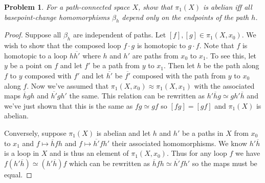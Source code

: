 \documentclass{article}
\newtheorem{problem}{Problem}
\begin{document}
\begin{problem}
For a path-connected space $X$, show that $\pi_1(X)$ is abelian iff all basepoint-change homomorphisms $\beta_h$ depend only on the endpoints of the path $h$.
\end{problem}
\begin{proof}
Suppose all $\beta_h$ are independent of paths. Let $[f],[g] \in \pi_1(X, x_0)$. We wish to show that the composed loop $f \cdot g$ is homotopic to $g \cdot f$. Note that $f$ is homotopic to a loop $h\overline{h'}$ where $h$ and $h'$ are paths from $x_0$ to $x_1$. To see this, let $y$ be a point on $f$ and let $f'$ be a path from $y$ to $x_1$. Then let $h$ be the path along $f$ to $y$ composed with $f'$ and let $\overline{h'}$ be $\overline{f'}$ composed with the path from $y$ to $x_0$ along $f$.
\vspace{100pt}
Now we've assumed that $\pi_1(X,x_0) \approx \pi_1(X,x_1)$ with the associated maps $\overline{h}gh$ and $\overline{h'}gh'$ the same. This relation can be rewritten as $h'\overline{h}g \simeq gh'\overline{h}$ and we've just shown that this is the same as $fg \simeq gf$ so $[fg] = [gf]$ and $\pi_1(X)$ is abelian.

Conversely, suppose $\pi_1(X)$ is abelian and let $h$ and $h'$ be a paths in $X$ from $x_0$ to $x_1$ and $f \mapsto \overline{h}fh$ and $f \mapsto \overline{h'}fh'$ their associated homomorphisms. We know $h' \overline{h}$ is a loop in $X$ and is thus an element of $\pi_1(X,x_0)$. Thus for any loop $f$ we have $f (h' \overline{h}) \simeq (h' \overline{h})f$ which can be rewritten as $\overline{h}fh \simeq \overline{h'}fh'$ so the maps must be equal.
\end{proof}
\end{document}
